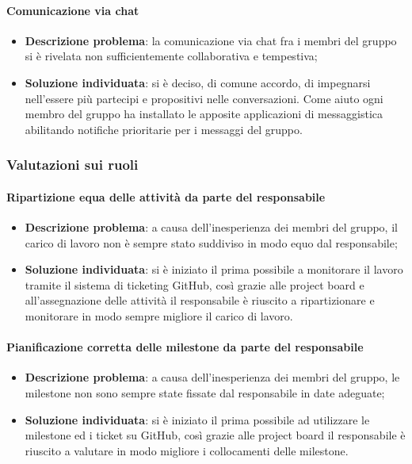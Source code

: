 		\paragraph{Comunicazione via chat}
				\begin{itemize}
				\item \textbf{Descrizione problema}: la comunicazione via chat fra i membri del gruppo si è rivelata non sufficientemente collaborativa e tempestiva;
				\item \textbf{Soluzione individuata}: si è deciso, di comune accordo, di impegnarsi nell'essere più partecipi e propositivi nelle conversazioni. Come aiuto ogni membro del gruppo ha installato le apposite applicazioni di messaggistica abilitando notifiche prioritarie per i messaggi del gruppo.
				\end{itemize}
	\subsubsection{Valutazioni sui ruoli}
		\paragraph{Ripartizione equa delle attività da parte del responsabile}
		\begin{itemize}
			\item \textbf{Descrizione problema}: a causa dell'inesperienza dei membri del gruppo, il carico di lavoro non è sempre stato suddiviso in modo equo dal responsabile;
			\item \textbf{Soluzione individuata}: si è iniziato il prima possibile a monitorare il lavoro tramite il sistema di ticketing GitHub, così grazie alle project board e all'assegnazione delle attività il responsabile è riuscito a ripartizionare e monitorare in modo sempre migliore il carico di lavoro.
		\end{itemize}
		\paragraph{Pianificazione corretta delle milestone da parte del responsabile}
		\begin{itemize}
		\item \textbf{Descrizione problema}: a causa dell'inesperienza dei membri del gruppo, le milestone non sono sempre state fissate dal responsabile in date adeguate;
		\item \textbf{Soluzione individuata}: si è iniziato il prima possibile ad utilizzare le milestone ed i ticket su GitHub, così grazie alle project board il responsabile è riuscito a valutare in modo migliore i collocamenti delle milestone.
		\end{itemize}
